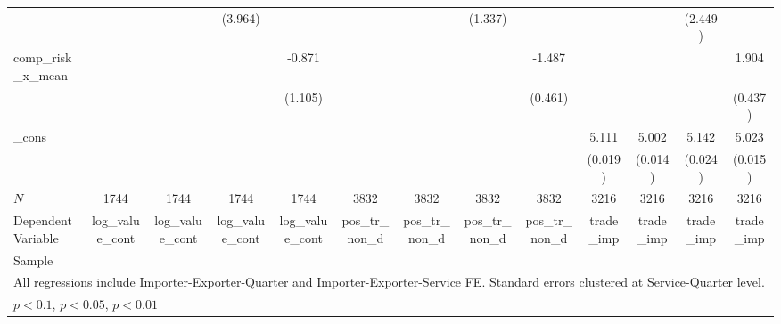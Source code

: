 \begin{table}[htbp]
\begin{tabular}{l*{12}{c}}
            &                     &                     &     (3.964)         &                     &                     &                     &     (1.337)         &                     &                     &                     &     (2.449)         &                     \\
[1em]
comp\_risk\_x\_mean&                     &                     &                     &      -0.871         &                     &                     &                     &      -1.487\sym{***}&                     &                     &                     &       1.904\sym{***}\\
            &                     &                     &                     &     (1.105)         &                     &                     &                     &     (0.461)         &                     &                     &                     &     (0.437)         \\
[1em]
\_cons      &                     &                     &                     &                     &                     &                     &                     &                     &       5.111\sym{***}&       5.002\sym{***}&       5.142\sym{***}&       5.023\sym{***}\\
            &                     &                     &                     &                     &                     &                     &                     &                     &     (0.019)         &     (0.014)         &     (0.024)         &     (0.015)         \\
\hline
\(N\)       &        1744         &        1744         &        1744         &        1744         &        3832         &        3832         &        3832         &        3832         &        3216         &        3216         &        3216         &        3216         \\
Dependent Variable&log\_value\_cont         &log\_value\_cont         &log\_value\_cont         &log\_value\_cont         &pos\_tr\_non\_d         &pos\_tr\_non\_d         &pos\_tr\_non\_d         &pos\_tr\_non\_d         &   trade\_imp         &   trade\_imp         &   trade\_imp         &   trade\_imp         \\
Sample      &                     &                     &                     &                     &                     &                     &                     &                     &                     &                     &                     &                     \\
\hline\hline
\multicolumn{13}{l}{\footnotesize All regressions include Importer-Exporter-Quarter and Importer-Exporter-Service FE. Standard errors clustered at Service-Quarter level.}\\
\multicolumn{13}{l}{\footnotesize \sym{*} \(p<0.1\), \sym{**} \(p<0.05\), \sym{***} \(p<0.01\)}\\
\end{tabular}
\end{table}
